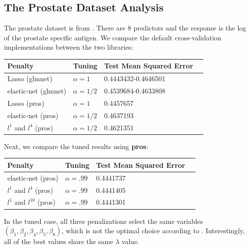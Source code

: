 \documentclass[article]{jss}
\numberwithin{equation}{section}
\begin{document}
\subsection{The Prostate Dataset Analysis}

The prostate dataset is from \cite{prostate}.
There are 8 predictors and the response is the log of the prostate specific antigen.
We compare the default cross-validation implementations between the two libraries:

\begin{center}
\setlength{\tabcolsep}{20pt} %
\renewcommand{\arraystretch}{1} %
\begin{tabular}{lllp{7.4cm}}
\hline
Penalty & Tuning & Test Mean Squared Error \\ \hline
Lasso (glmnet) & $\alpha = 1$ & 0.4443432-0.4646501 \\
elastic-net (glmnet) & $\alpha = 1/2$  & 0.4539684-0.4633808   \\
Lasso (pros) & $\alpha = 1$ &  0.4457657 \\
elastic-net (pros) & $\alpha = 1/2$ &  0.4637193 \\
$l^1$ and $l^{4}$ (pros) & $\alpha = 1/2$ &  0.4621351 \\ \hline
\end{tabular}
\end{center}

Next, we compare the tuned results using \textbf{pros}:

\begin{center}
\setlength{\tabcolsep}{20pt} %
\renewcommand{\arraystretch}{1} %
\begin{tabular}{lllp{7.4cm}}
\hline
Penalty & Tuning & Test Mean Squared Error \\ \hline
elastic-net (pros) & $\alpha = .99$ & 0.4441737 \\
$l^1$ and $l^{4}$ (pros) & $\alpha = .99$ &  0.4441405 \\
$l^1$ and $l^{10}$ (pros) & $\alpha = .99$ &  0.4441301 \\ \hline
\end{tabular}
\end{center}

In the tuned case, all three penalizations select the same variables $(\beta_1, \beta_2, \beta_4, \beta_5, \beta_8)$, which is not the optimal choice according to \cite{elasticnet}. Interestingly, all of the best values share the same $\lambda$ value.
\end{document}
